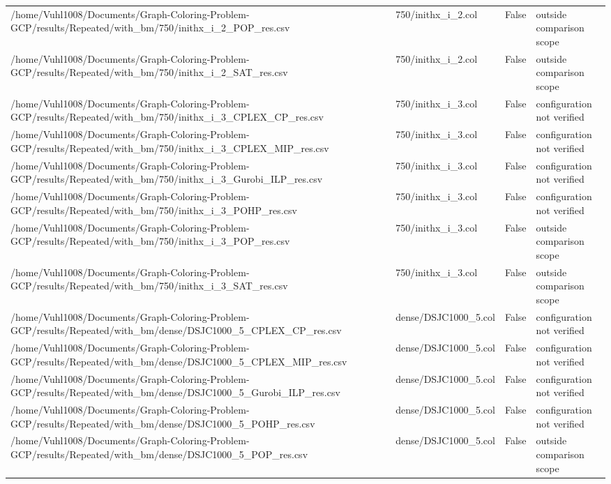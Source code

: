 \begin{table}[htbp]
\begin{tabular}{llll}
/home/Vuhl1008/Documents/Graph-Coloring-Problem-GCP/results/Repeated/with\_bm/750/inithx\_i\_2\_POP\_res.csv & 750/inithx\_i\_2.col & False & outside comparison scope \\
/home/Vuhl1008/Documents/Graph-Coloring-Problem-GCP/results/Repeated/with\_bm/750/inithx\_i\_2\_SAT\_res.csv & 750/inithx\_i\_2.col & False & outside comparison scope \\
/home/Vuhl1008/Documents/Graph-Coloring-Problem-GCP/results/Repeated/with\_bm/750/inithx\_i\_3\_CPLEX\_CP\_res.csv & 750/inithx\_i\_3.col & False & configuration not verified \\
/home/Vuhl1008/Documents/Graph-Coloring-Problem-GCP/results/Repeated/with\_bm/750/inithx\_i\_3\_CPLEX\_MIP\_res.csv & 750/inithx\_i\_3.col & False & configuration not verified \\
/home/Vuhl1008/Documents/Graph-Coloring-Problem-GCP/results/Repeated/with\_bm/750/inithx\_i\_3\_Gurobi\_ILP\_res.csv & 750/inithx\_i\_3.col & False & configuration not verified \\
/home/Vuhl1008/Documents/Graph-Coloring-Problem-GCP/results/Repeated/with\_bm/750/inithx\_i\_3\_POHP\_res.csv & 750/inithx\_i\_3.col & False & configuration not verified \\
/home/Vuhl1008/Documents/Graph-Coloring-Problem-GCP/results/Repeated/with\_bm/750/inithx\_i\_3\_POP\_res.csv & 750/inithx\_i\_3.col & False & outside comparison scope \\
/home/Vuhl1008/Documents/Graph-Coloring-Problem-GCP/results/Repeated/with\_bm/750/inithx\_i\_3\_SAT\_res.csv & 750/inithx\_i\_3.col & False & outside comparison scope \\
/home/Vuhl1008/Documents/Graph-Coloring-Problem-GCP/results/Repeated/with\_bm/dense/DSJC1000\_5\_CPLEX\_CP\_res.csv & dense/DSJC1000\_5.col & False & configuration not verified \\
/home/Vuhl1008/Documents/Graph-Coloring-Problem-GCP/results/Repeated/with\_bm/dense/DSJC1000\_5\_CPLEX\_MIP\_res.csv & dense/DSJC1000\_5.col & False & configuration not verified \\
/home/Vuhl1008/Documents/Graph-Coloring-Problem-GCP/results/Repeated/with\_bm/dense/DSJC1000\_5\_Gurobi\_ILP\_res.csv & dense/DSJC1000\_5.col & False & configuration not verified \\
/home/Vuhl1008/Documents/Graph-Coloring-Problem-GCP/results/Repeated/with\_bm/dense/DSJC1000\_5\_POHP\_res.csv & dense/DSJC1000\_5.col & False & configuration not verified \\
/home/Vuhl1008/Documents/Graph-Coloring-Problem-GCP/results/Repeated/with\_bm/dense/DSJC1000\_5\_POP\_res.csv & dense/DSJC1000\_5.col & False & outside comparison scope \\

\end{tabular}
\end{table}
